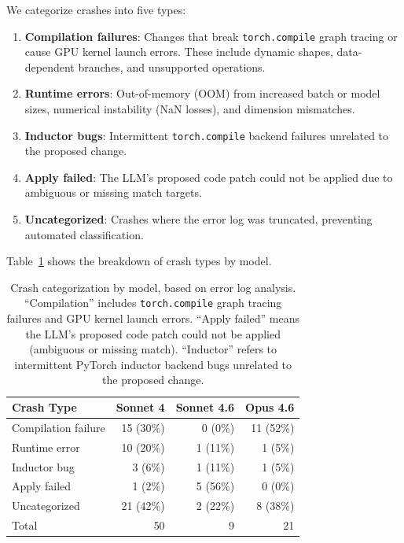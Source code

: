 \documentclass[11pt]{article}
\begin{document}
We categorize crashes into five types:

\begin{enumerate}[leftmargin=*]
    \item \textbf{Compilation failures}: Changes that break \texttt{torch.compile} graph tracing or cause GPU kernel launch errors. These include dynamic shapes, data-dependent branches, and unsupported operations.
    \item \textbf{Runtime errors}: Out-of-memory (OOM) from increased batch or model sizes, numerical instability (NaN losses), and dimension mismatches.
    \item \textbf{Inductor bugs}: Intermittent \texttt{torch.compile} backend failures unrelated to the proposed change.
    \item \textbf{Apply failed}: The LLM's proposed code patch could not be applied due to ambiguous or missing match targets.
    \item \textbf{Uncategorized}: Crashes where the error log was truncated, preventing automated classification.
\end{enumerate}

Table~\ref{tab:crash_categories} shows the breakdown of crash types by model.

\begin{table}[H]
\centering
\caption{Crash categorization by model, based on error log analysis. ``Compilation'' includes \texttt{torch.compile} graph tracing failures and GPU kernel launch errors. ``Apply failed'' means the LLM's proposed code patch could not be applied (ambiguous or missing match). ``Inductor'' refers to intermittent PyTorch inductor backend bugs unrelated to the proposed change.}
\label{tab:crash_categories}
\begin{tabular}{lrrr}
\toprule
\textbf{Crash Type} & \textbf{Sonnet 4} & \textbf{Sonnet 4.6} & \textbf{Opus 4.6} \\
\midrule
Compilation failure  & 15 (30\%) & 0 (0\%)   & 11 (52\%) \\
Runtime error        & 10 (20\%) & 1 (11\%)  & 1 (5\%)   \\
Inductor bug         & 3 (6\%)   & 1 (11\%)  & 1 (5\%)   \\
Apply failed         & 1 (2\%)   & 5 (56\%)  & 0 (0\%)   \\
Uncategorized        & 21 (42\%) & 2 (22\%)  & 8 (38\%)  \\
\midrule
Total                & 50        & 9         & 21        \\
\bottomrule
\end{tabular}
\end{table}
\end{document}

